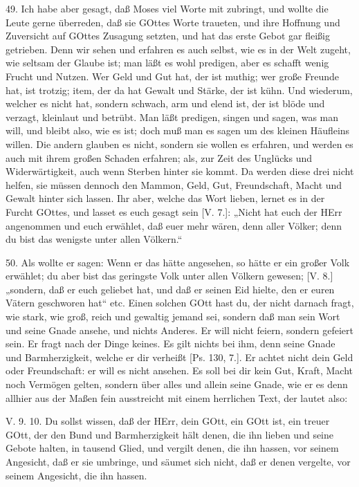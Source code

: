 49. Ich habe aber gesagt, daß Moses viel Worte mit zubringt, und wollte die Leute gerne überreden, daß sie GOttes Worte traueten, und ihre Hoffnung und Zuversicht auf GOttes Zusagung setzten, und hat das erste Gebot gar fleißig getrieben. Denn wir sehen und erfahren es auch selbst, wie es in der Welt zugeht, wie seltsam der Glaube ist; man läßt es wohl predigen, aber es schafft wenig Frucht und Nutzen. Wer Geld und Gut hat, der ist muthig; wer große Freunde hat, ist trotzig; item, der da hat Gewalt und Stärke, der ist kühn. Und wiederum, welcher es nicht hat, sondern schwach, arm und elend ist, der ist blöde und verzagt, kleinlaut und betrübt. Man läßt predigen, singen und sagen, was man will, und bleibt also, wie es ist; doch muß man es sagen um des kleinen Häufleins willen. Die andern glauben es nicht, sondern sie wollen es erfahren, und werden es auch mit ihrem großen Schaden erfahren; als, zur Zeit des Unglücks und Widerwärtigkeit, auch wenn Sterben hinter sie kommt. Da werden diese drei nicht helfen, sie müssen dennoch den Mammon, Geld, Gut, Freundschaft, Macht und Gewalt hinter sich lassen. Ihr aber, welche das Wort lieben, lernet es in der Furcht GOttes, und lasset es euch gesagt sein [V. 7.]: „Nicht hat euch der HErr angenommen und euch erwählet, daß euer mehr wären, denn aller Völker; denn du bist das wenigste unter allen Völkern.“

50. Als wollte er sagen: Wenn er das hätte angesehen, so hätte er ein großer Volk erwählet; du aber bist das geringste Volk unter allen Völkern gewesen; [V. 8.] „sondern, daß er euch geliebet hat, und daß er seinen Eid hielte, den er euren Vätern geschworen hat“ etc. Einen solchen GOtt hast du, der nicht darnach fragt, wie stark, wie groß, reich und gewaltig jemand sei, sondern daß man sein Wort und seine Gnade ansehe, und nichts Anderes. Er will nicht feiern, sondern gefeiert sein. Er fragt nach der Dinge keines. Es gilt nichts bei ihm, denn seine Gnade und Barmherzigkeit, welche er dir verheißt [Ps. 130, 7.]. Er achtet nicht dein Geld oder Freundschaft: er will es nicht ansehen. Es soll bei dir kein Gut, Kraft, Macht noch Vermögen gelten, sondern über alles und allein seine Gnade, wie er es denn allhier aus der Maßen fein ausstreicht mit einem herrlichen Text, der lautet also:

\begin{schriftzitat}
V. 9. 10. Du sollst wissen, daß der HErr, dein GOtt, ein GOtt ist, ein treuer GOtt, der den Bund und Barmherzigkeit hält denen, die ihn lieben und seine Gebote halten, in tausend Glied, und vergilt denen, die ihn hassen, vor seinem Angesicht, daß er sie umbringe, und säumet sich nicht, daß er denen vergelte, vor seinem Angesicht, die ihn hassen.
\end{schriftzitat}

